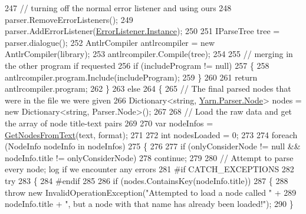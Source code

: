 \begin{DoxyCode}
247                 \textcolor{comment}{// turning off the normal error listener and using ours}
248                 parser.RemoveErrorListeners();
249                 parser.AddErrorListener(\hyperlink{a00094_a47b8f4f1d414afa1ea6067218c7ee34d}{ErrorListener.Instance});
250 
251                 IParseTree tree = parser.dialogue();
252                 AntlrCompiler antlrcompiler = \textcolor{keyword}{new} AntlrCompiler(library);
253                 antlrcompiler.Compile(tree);
254 
255                 \textcolor{comment}{// merging in the other program if requested}
256                 \textcolor{keywordflow}{if} (includeProgram != null)
257                 \{
258                     antlrcompiler.program.Include(includeProgram);
259                 \}
260 
261                 \textcolor{keywordflow}{return} antlrcompiler.program;
262             \}
263             \textcolor{keywordflow}{else}
264             \{
265                 \textcolor{comment}{// The final parsed nodes that were in the file we were given}
266                 Dictionary<string, \hyperlink{a00132}{Yarn.Parser.Node}> nodes = \textcolor{keyword}{new} Dictionary<string, 
      Parser.Node>();
267 
268                 \textcolor{comment}{// Load the raw data and get the array of node title-text pairs}
269 
270                 var nodeInfos = \hyperlink{a00127_a0aa76ba9366b44bf78198a78ea958c9c}{GetNodesFromText}(text, format);
271 
272                 \textcolor{keywordtype}{int} nodesLoaded = 0;
273 
274                 \textcolor{keywordflow}{foreach} (NodeInfo nodeInfo \textcolor{keywordflow}{in} nodeInfos)
275                 \{
276 
277                     \textcolor{keywordflow}{if} (onlyConsiderNode != null && nodeInfo.title != onlyConsiderNode)
278                         \textcolor{keywordflow}{continue};
279 
280                     \textcolor{comment}{// Attempt to parse every node; log if we encounter any errors}
281 \textcolor{preprocessor}{#if CATCH\_EXCEPTIONS}
282 \textcolor{preprocessor}{}                    \textcolor{keywordflow}{try}
283                     \{
284 \textcolor{preprocessor}{#endif}
285 \textcolor{preprocessor}{}
286                         \textcolor{keywordflow}{if} (nodes.ContainsKey(nodeInfo.title))
287                         \{
288                             \textcolor{keywordflow}{throw} \textcolor{keyword}{new} InvalidOperationException(\textcolor{stringliteral}{"Attempted to load a node called "} +
289                                 nodeInfo.title + \textcolor{stringliteral}{", but a node with that name has already been loaded!"});
290                         \}

\end{DoxyCode}
